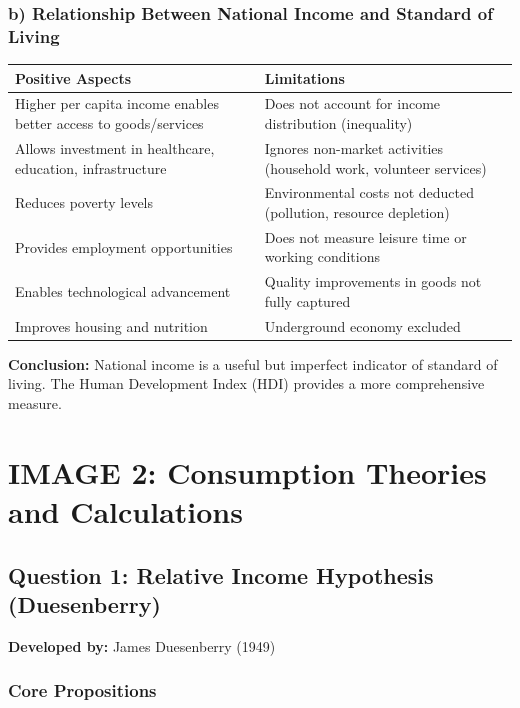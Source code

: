 \documentclass[12pt,a4paper]{article}
\begin{document}
\subsubsection*{b) Relationship Between National Income and Standard of Living}

\begin{center}
\begin{tabular}{@{}p{6cm}p{6cm}@{}}
\toprule
\textbf{Positive Aspects} & \textbf{Limitations} \\
\midrule
Higher per capita income enables better access to goods/services & Does not account for income distribution (inequality) \\
\addlinespace
Allows investment in healthcare, education, infrastructure & Ignores non-market activities (household work, volunteer services) \\
\addlinespace
Reduces poverty levels & Environmental costs not deducted (pollution, resource depletion) \\
\addlinespace
Provides employment opportunities & Does not measure leisure time or working conditions \\
\addlinespace
Enables technological advancement & Quality improvements in goods not fully captured \\
\addlinespace
Improves housing and nutrition & Underground economy excluded \\
\bottomrule
\end{tabular}
\end{center}

\textbf{Conclusion:} National income is a useful but imperfect indicator of standard of living. The Human Development Index (HDI) provides a more comprehensive measure.

\newpage
\section{IMAGE 2: Consumption Theories and Calculations}

\subsection{Question 1: Relative Income Hypothesis (Duesenberry)}

\textbf{Developed by:} James Duesenberry (1949)

\subsubsection*{Core Propositions}
\end{document}
